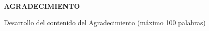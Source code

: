 \thispagestyle{empty} %
\begin{flushright}
	
	\medspace
	\vspace{1.5cm}
	
	\textbf{\large AGRADECIMIENTO}\\
	
	\vspace{1cm}
	
	Desarrollo del contenido del Agradecimiento (máximo 100 palabras)
	
\end{flushright}